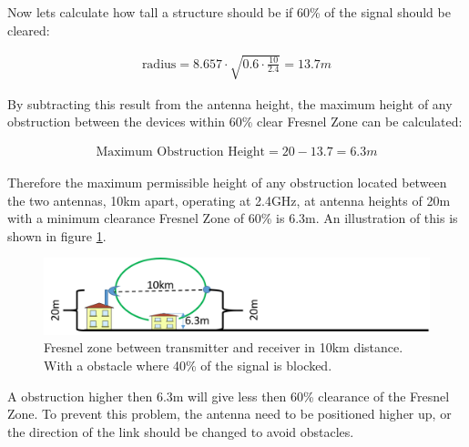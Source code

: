 \noindent Now lets calculate how tall a structure should be if 60\% of the signal should be cleared:

\begin{align*}
\text{radius} = 8.657\cdot \sqrt{0.6\cdot \frac{10}{2.4}} = 13.7m
\end{align*}
  
\noindent By subtracting this result from the antenna height, the maximum height of any obstruction between the devices within 60\% clear Fresnel Zone can be calculated:

\begin{align*}
\text{Maximum Obstruction Height} = 20 - 13.7 = 6.3m
\end{align*}

Therefore the maximum permissible height of any obstruction located between the two antennas, 10km apart, operating at 2.4GHz, at antenna heights of 20m with a minimum clearance Fresnel Zone of 60\% is 6.3m. An illustration of this is shown in figure \ref{fig:fresnel_zones_10km_60procent}.

\begin{figure}[H]
	\centering
	\includegraphics[scale=0.50]{figures/fresnel_10km_60procent.png}
	\caption{Fresnel zone between transmitter and receiver in 10km distance. With a obstacle where 40\% of the signal is blocked.}
	\label{fig:fresnel_zones_10km_60procent}
\end{figure}  

\noindent A obstruction higher then 6.3m will give less then 60\% clearance of the Fresnel Zone. To prevent this problem, the antenna need to be positioned higher up, or the direction of the link should be changed to avoid obstacles.

